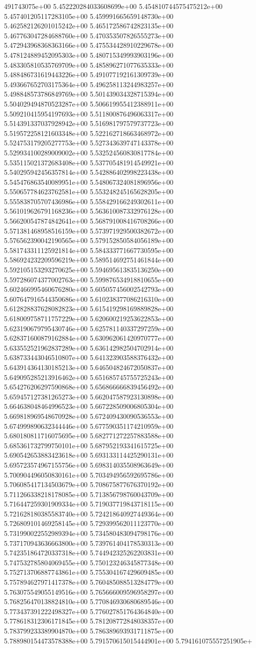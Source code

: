 491743075e+00	5.452220284033608699e+00	5.454810744575475212e+00	5.457401205117283105e+00	5.459991665659148730e+00	5.462582126201015242e+00	5.465172586742823135e+00	5.467763047284688760e+00	5.470353507826555273e+00	5.472943968368363166e+00	5.475534428910229678e+00	5.478124889452095303e+00	5.480715349993903196e+00	5.483305810535769709e+00	5.485896271077635333e+00	5.488486731619443226e+00	5.491077192161309739e+00	5.493667652703175364e+00	5.496258113244983257e+00	5.498848573786849769e+00	5.501439034328715394e+00	5.504029494870523287e+00	5.506619955412388911e+00	5.509210415954197693e+00	5.511800876496063317e+00	5.514391337037928942e+00	5.516981797579737723e+00	5.519572258121603348e+00	5.522162718663468972e+00	5.524753179205277753e+00	5.527343639747143378e+00	5.529934100289009002e+00	5.532524560830817784e+00	5.535115021372683408e+00	5.537705481914549921e+00	5.540295942456357814e+00	5.542886402998223438e+00	5.545476863540089951e+00	5.548067324081896956e+00	5.550657784623762581e+00	5.553248245165628205e+00	5.555838705707436986e+00	5.558429166249302611e+00	5.561019626791168236e+00	5.563610087332976128e+00	5.566200547874842641e+00	5.568791008416708266e+00	5.571381468958516159e+00	5.573971929500382672e+00	5.576562390042190565e+00	5.579152850584056189e+00	5.581743311125921814e+00	5.584333771667730595e+00	5.586924232209596219e+00	5.589514692751461844e+00	5.592105153293270625e+00	5.594695613835136250e+00	5.597286074377002763e+00	5.599876534918810655e+00	5.602466995460676280e+00	5.605057456002542793e+00	5.607647916544350686e+00	5.610238377086216310e+00	5.612828837628082823e+00	5.615419298169889828e+00	5.618009758711757229e+00	5.620600219253622853e+00	5.623190679795430746e+00	5.625781140337297259e+00	5.628371600879162884e+00	5.630962061420970777e+00	5.633552521962837289e+00	5.636142982504702914e+00	5.638733443046510807e+00	5.641323903588376432e+00	5.643914364130185213e+00	5.646504824672050837e+00	5.649095285213916462e+00	5.651685745755725243e+00	5.654276206297590868e+00	5.656866666839456492e+00	5.659457127381265273e+00	5.662047587923130898e+00	5.664638048464996523e+00	5.667228509006805304e+00	5.669818969548670928e+00	5.672409430090536553e+00	5.674999890632344446e+00	5.677590351174210959e+00	5.680180811716075695e+00	5.682771272257883588e+00	5.685361732799750101e+00	5.687952193341615725e+00	5.690542653883423618e+00	5.693133114425290131e+00	5.695723574967155756e+00	5.698314035508963649e+00	5.700904496050830161e+00	5.703494956592695786e+00	5.706085417134503679e+00	5.708675877676370192e+00	5.711266338218178085e+00	5.713856798760043709e+00	5.716447259301909334e+00	5.719037719843718115e+00	5.721628180385583740e+00	5.724218640927449364e+00	5.726809101469258145e+00	5.729399562011123770e+00	5.731990022552989394e+00	5.734580483094798176e+00	5.737170943636663800e+00	5.739761404178530313e+00	5.742351864720337318e+00	5.744942325262203831e+00	5.747532785804069455e+00	5.750123246345877348e+00	5.752713706887743861e+00	5.755304167429609485e+00	5.757894627971417378e+00	5.760485088513284779e+00	5.763075549055149516e+00	5.765666009596958297e+00	5.768256470138824810e+00	5.770846930680689546e+00	5.773437391222498327e+00	5.776027851764364840e+00	5.778618312306171845e+00	5.781208772848038357e+00	5.783799233389904870e+00	5.786389693931711875e+00	5.788980154473578388e+00	5.791570615015444901e+00	5.794161075557251905e+